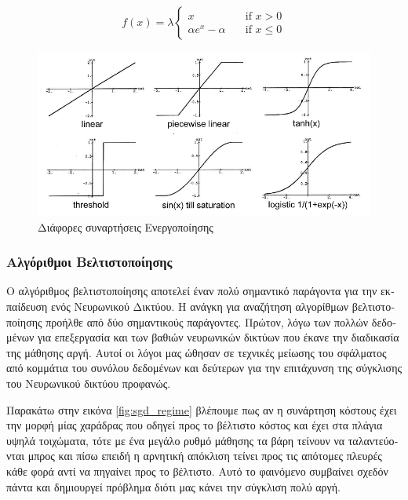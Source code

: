 \begin{equation}
 f(x) = \lambda
\begin{cases}
    x   & \quad \text{if } x > 0 \\
    \alpha e^{x} - \alpha & \quad \text{if } x \leq 0
\end{cases}
\end{equation}


\begin{figure}[H]
 \label{act_func_img}
 \centering
 \includegraphics[scale=0.6]{Images/act_func}
 \caption[\textgreek{Συναρτήσεις Ενεργοποίησης}]{\textgreek{Διάφορες συναρτήσεις Ενεργοποίησης} \cite{act_funcs}}
\end{figure}


\subsubsection{\textgreek{Αλγόριθμοι Βελτιστοποίησης}}
\textgreek{Ο αλγόριθμος βελτιστοποίησης αποτελεί έναν πολύ σημαντικό παράγοντα για την εκπαίδευση ενός Νευρωνικού Δικτύου. Η ανάγκη για αναζήτηση αλγορίθμων βελτιστοποίησης προήλθε από δύο σημαντικούς παράγοντες. Πρώτον, λόγω των πολλών δεδομένων για επεξεργασία και των βαθιών νευρωνικών δικτύων που έκανε την διαδικασία της μάθησης αργή. Αυτοί οι λόγοι μας ώθησαν σε τεχνικές μείωσης του σφάλματος από κομμάτια του συνόλου δεδομένων και δεύτερων για την επιτάχυνση της σύγκλισης του Νευρωνικού δικτύου προφανώς.} 

\textgreek{Παρακάτω στην εικόνα }\ref{fig:sgd_regime} \textgreek{βλέπουμε πως αν η συνάρτηση κόστους έχει την μορφή μίας χαράδρας που οδηγεί προς το βέλτιστο κόστος και έχει στα πλάγια υψηλά τοιχώματα, τότε με ένα μεγάλο ρυθμό μάθησης τα βάρη τείνουν να ταλαντεύονται μπρος και πίσω επειδή η αρνητική απόκλιση τείνει προς τις απότομες πλευρές κάθε φορά αντί να πηγαίνει προς το βέλτιστο. Αυτό το φαινόμενο συμβαίνει σχεδόν πάντα και δημιουργεί πρόβλημα διότι μας κάνει την σύγκλιση πολύ αργή.}

